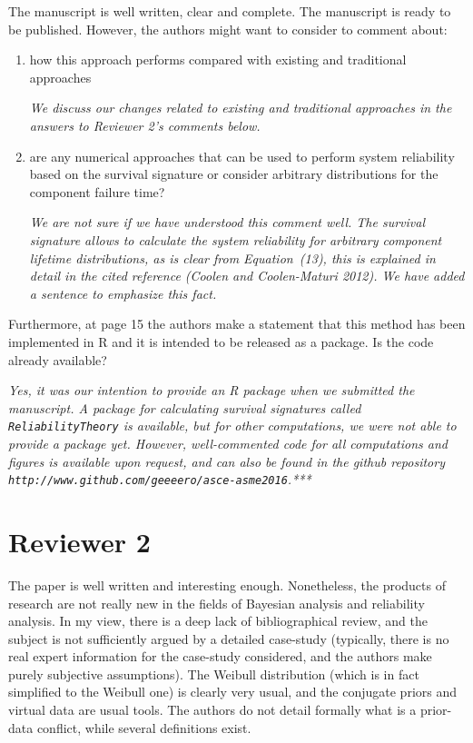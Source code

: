 \documentclass[Journal,SectionNumbers,SingleSpace,InsideFigs]{ascelike}
\begin{document}
The manuscript is well written, clear and complete. The manuscript is ready to be published.
However, the authors might want to consider to comment about:
\begin{enumerate}
\item how this approach performs compared with existing and traditional approaches

\smallskip

\emph{We discuss our changes related to existing and traditional approaches in the answers to Reviewer 2's comments below.}

\item are any numerical approaches that can be used to perform system reliability based on the survival signature
or consider arbitrary distributions for the component failure time?

\smallskip

\emph{We are not sure if we have understood this comment well.
The survival signature allows to calculate the system reliability for arbitrary component lifetime distributions,
as is clear from Equation~(13), this is explained in detail in the cited reference (Coolen and Coolen-Maturi 2012).
We have added a sentence to emphasize this fact.}
\end{enumerate}

Furthermore, at page 15 the authors make a statement that this method has been implemented in R
and it is intended to be released as a package. Is the code already available? 

\smallskip

\emph{Yes, it was our intention to provide an \textsf{R} package when we submitted the manuscript.
A package for calculating survival signatures called \texttt{ReliabilityTheory} is available,
but for other computations, we were not able to provide a package yet. %
However, well-commented code for all computations and figures is available upon request,
and can also be found in the github repository
\texttt{http://www.github.com/geeeero/asce-asme2016}.***}


\section*{Reviewer 2}

The paper is well written and interesting enough.
Nonetheless, the products of research are not really new in the fields of Bayesian analysis and reliability analysis.
In my view, there is a deep lack of bibliographical review,
and the subject is not sufficiently argued by a detailed case-study
(typically, there is no real expert information for the case-study considered, and the authors make purely subjective assumptions).
The Weibull distribution (which is in fact simplified to the Weibull one) is clearly very usual,
and the conjugate priors and virtual data are usual tools.
The authors do not detail formally what is a prior-data conflict, while several definitions exist.
\end{document}
